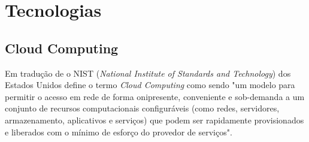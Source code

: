 
\section{Tecnologias}\label{sec:technology}

\subsection{Cloud Computing}
Em tradução de \cite{2019:Sehgal} o NIST
(\emph{National Institute of Standards and Technology}) dos Estados Unidos
define o termo \emph{Cloud Computing} como sendo "um modelo para permitir
o acesso em rede de forma onipresente, conveniente e sob-demanda
a um conjunto de recursos computacionais configuráveis (como redes,
servidores, armazenamento, aplicativos e serviços) que podem ser
rapidamente provisionados e liberados com o mínimo de esforço do provedor
de serviços".

